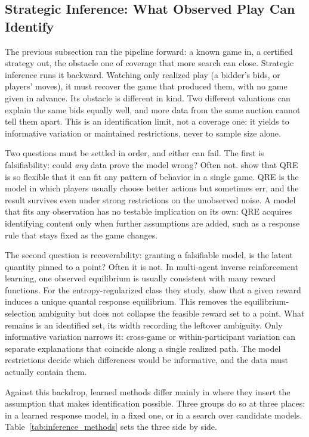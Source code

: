\subsection{Strategic Inference: What Observed Play Can Identify}
\label{sec:ai4gt:inference}

The previous subsection ran the pipeline forward: a known game in, a
certified strategy out, the obstacle one of coverage that more search can close.
Strategic inference runs it backward. Watching only realized play (a bidder's bids, or players' moves), it must
recover the game that produced them, with no game
given in advance. Its obstacle is different in kind. Two different valuations can
explain the same bids equally well, and more data from the same auction cannot tell
them apart. This is an identification limit, not a
coverage one: it yields to informative variation or maintained restrictions, never
to sample size alone.

Two questions must be settled in order, and either can fail. The first is
falsifiability: could \emph{any} data prove the model wrong? Often not.
\citet{HaileHortacsuKosenok2008} show that QRE is so flexible that it can fit
any pattern of behavior in a single game. QRE is the model in which players
usually choose better actions but sometimes err, and the result survives even
under strong restrictions on the unobserved noise. A model that fits any observation
has no testable implication on its own: QRE acquires identifying content only when
further assumptions are added, such as a
response rule that stays fixed as the game changes.

The second question is recoverability: granting a falsifiable model, is the latent
quantity pinned to a point? Often it is not. In multi-agent inverse reinforcement
learning, one observed equilibrium is usually consistent with many reward functions.
For the entropy-regularized class they study, \citet{FreihautRamponi2025} show that
a given reward induces a unique quantal response equilibrium. This removes the
equilibrium-selection ambiguity but does not collapse the feasible reward set to a
point. What remains is an identified set, its width recording the leftover
ambiguity. Only informative variation narrows it: cross-game or within-participant
variation can separate explanations that coincide along a single realized path. The
model restrictions decide which differences would be informative, and the data must
actually contain them.

Against this backdrop, learned methods differ mainly in where they insert the
assumption that makes identification possible. Three groups do so at three places:
in a learned response model, in a fixed one, or in a search over candidate models.
Table~\ref{tab:inference_methods} sets the three side by side.

